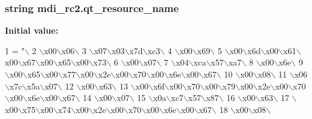 \subsubsection[{qt\+\_\+resource\+\_\+name}]{\setlength{\rightskip}{0pt plus 5cm}string mdi\+\_\+rc2.\+qt\+\_\+resource\+\_\+name}\label{namespacemdi__rc2_af6f3142d8626f13102f63b05a93af68d}
{\bfseries Initial value\+:}
\begin{DoxyCode}
1 = \textcolor{stringliteral}{"\(\backslash\)}
2 \textcolor{stringliteral}{\(\backslash\)x00\(\backslash\)x06\(\backslash\)}
3 \textcolor{stringliteral}{\(\backslash\)x07\(\backslash\)x03\(\backslash\)x7d\(\backslash\)xc3\(\backslash\)}
4 \textcolor{stringliteral}{\(\backslash\)x00\(\backslash\)x69\(\backslash\)}
5 \textcolor{stringliteral}{\(\backslash\)x00\(\backslash\)x6d\(\backslash\)x00\(\backslash\)x61\(\backslash\)x00\(\backslash\)x67\(\backslash\)x00\(\backslash\)x65\(\backslash\)x00\(\backslash\)x73\(\backslash\)}
6 \textcolor{stringliteral}{\(\backslash\)x00\(\backslash\)x07\(\backslash\)}
7 \textcolor{stringliteral}{\(\backslash\)x04\(\backslash\)xca\(\backslash\)x57\(\backslash\)xa7\(\backslash\)}
8 \textcolor{stringliteral}{\(\backslash\)x00\(\backslash\)x6e\(\backslash\)}
9 \textcolor{stringliteral}{\(\backslash\)x00\(\backslash\)x65\(\backslash\)x00\(\backslash\)x77\(\backslash\)x00\(\backslash\)x2e\(\backslash\)x00\(\backslash\)x70\(\backslash\)x00\(\backslash\)x6e\(\backslash\)x00\(\backslash\)x67\(\backslash\)}
10 \textcolor{stringliteral}{\(\backslash\)x00\(\backslash\)x08\(\backslash\)}
11 \textcolor{stringliteral}{\(\backslash\)x06\(\backslash\)x7c\(\backslash\)x5a\(\backslash\)x07\(\backslash\)}
12 \textcolor{stringliteral}{\(\backslash\)x00\(\backslash\)x63\(\backslash\)}
13 \textcolor{stringliteral}{\(\backslash\)x00\(\backslash\)x6f\(\backslash\)x00\(\backslash\)x70\(\backslash\)x00\(\backslash\)x79\(\backslash\)x00\(\backslash\)x2e\(\backslash\)x00\(\backslash\)x70\(\backslash\)x00\(\backslash\)x6e\(\backslash\)x00\(\backslash\)x67\(\backslash\)}
14 \textcolor{stringliteral}{\(\backslash\)x00\(\backslash\)x07\(\backslash\)}
15 \textcolor{stringliteral}{\(\backslash\)x0a\(\backslash\)xc7\(\backslash\)x57\(\backslash\)x87\(\backslash\)}
16 \textcolor{stringliteral}{\(\backslash\)x00\(\backslash\)x63\(\backslash\)}
17 \textcolor{stringliteral}{\(\backslash\)x00\(\backslash\)x75\(\backslash\)x00\(\backslash\)x74\(\backslash\)x00\(\backslash\)x2e\(\backslash\)x00\(\backslash\)x70\(\backslash\)x00\(\backslash\)x6e\(\backslash\)x00\(\backslash\)x67\(\backslash\)}
18 \textcolor{stringliteral}{\(\backslash\)x00\(\backslash\)x08\(\backslash\)}

\end{DoxyCode}
